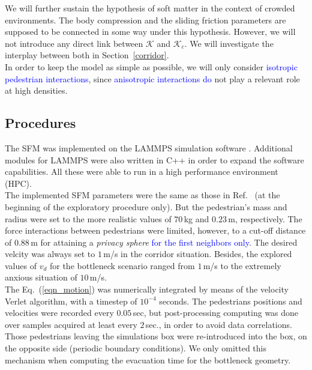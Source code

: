 \documentclass[preprint,12pt]{elsarticle}
\begin{document}
We will further sustain the hypothesis of soft matter in the context of crowded 
environments. The body compression and the sliding friction parameters are 
supposed to be connected in some way under this hypothesis. However, we will 
not introduce any direct link between $\mathcal{K}$ and $\mathcal{K}_c$. We 
will investigate the interplay between both in Section~\ref{corridor}. 
\\

In order to keep the model as simple as possible, we will only consider 
\textcolor{blue}{isotropic pedestrian interactions}, since \textcolor{blue}{anisotropic
interactions do} not play a relevant role at high densities. \\ 



\subsection{Procedures} 

The SFM was implemented on the LAMMPS simulation software \cite{plimpton}. 
Additional modules for LAMMPS were also written in C++ in order to expand the 
software capabilities. All these were able to run in a high performance 
environment (HPC). \\


The implemented SFM parameters were the same as those in 
Ref.~\cite{helbing_2000} (at the beginning of the exploratory procedure only). 
But the pedestrian's mass and radius were set to the more realistic values of 
$70\,$kg and $0.23\,$m, respectively. The force interactions between 
pedestrians were limited, however, to a cut-off distance of $0.88\,$m for 
attaining a \textit{privacy sphere} \textcolor{blue}{for the first neighbors only}. The desired 
velcity was always set to $1\,$m/s in the corridor situation. Besides, the 
explored values of $v_d$ for the bottleneck scenario ranged from $1\,$m/s to the 
extremely anxious situation of $10\,$m/s. \\


The Eq.~(\ref{eqn_motion}) was numerically integrated by means of the velocity 
Verlet algorithm, with a timestep of $10^{-4}$ seconds. The pedestrians 
positions and velocities were recorded every $0.05\,$sec, but post-processing 
computing was done over samples acquired at least every $2\,$sec., in order to avoid 
data correlations. Those pedestrians leaving the simulations box were 
re-introduced into the box, on the opposite side (periodic boundary 
conditions). We only omitted this mechanism when computing the evacuation time 
for the bottleneck geometry. \\ 
\end{document}
